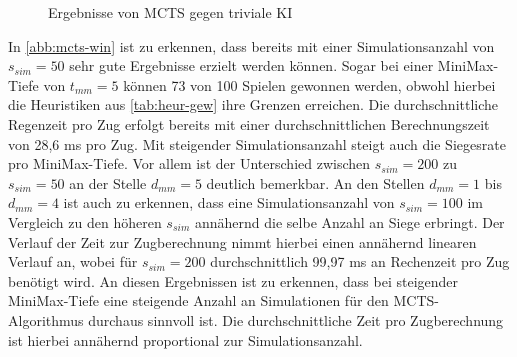 \documentclass[12pt,a4paper,bibliography=totocnumbered,listof=totocnumbered]{article}
\begin{document}
\begin{figure} [h]
\begin{minipage}[b]{0.45\linewidth}
\centering
{}
\label{abb:mcts-win}
\end{minipage}
\hfill
\begin{minipage}[b]{0.45\linewidth}
\centering
{}
\label{abb:mcts-runtime}
\end{minipage}
\caption{Ergebnisse von MCTS gegen triviale KI}
\label{abb:mcts-triv-erg}
\end{figure}

In \autoref{abb:mcts-win} ist zu erkennen, dass bereits mit einer Simulationsanzahl von $s_{sim} = 50$ sehr gute Ergebnisse erzielt werden können. Sogar bei einer MiniMax-Tiefe von $t_{mm} = 5$ können 73 von 100 Spielen gewonnen werden, obwohl hierbei die Heuristiken aus \autoref{tab:heur-gew} ihre Grenzen erreichen. Die durchschnittliche Regenzeit pro Zug erfolgt bereits mit einer durchschnittlichen Berechnungszeit von 28,6 ms pro Zug. Mit steigender Simulationsanzahl steigt auch die Siegesrate pro MiniMax-Tiefe. Vor allem ist der Unterschied zwischen $s_{sim} = 200$ zu $s_{sim} = 50$ an der Stelle $d_{mm} = 5$ deutlich bemerkbar. An den Stellen $d_{mm} = 1$ bis $d_{mm} = 4$ ist auch zu erkennen, dass eine Simulationsanzahl von $s_{sim} = 100$ im Vergleich zu den höheren $s_{sim}$ annähernd die selbe Anzahl an Siege erbringt. Der Verlauf der Zeit zur Zugberechnung nimmt hierbei einen annähernd linearen Verlauf an, wobei für $s_{sim} = 200$ durchschnittlich 99,97 ms an Rechenzeit pro Zug benötigt wird. An diesen Ergebnissen ist zu erkennen, dass bei steigender MiniMax-Tiefe eine steigende Anzahl an Simulationen für den MCTS-Algorithmus durchaus sinnvoll ist. Die durchschnittliche Zeit pro Zugberechnung ist hierbei annähernd proportional zur Simulationsanzahl.
\end{document}
